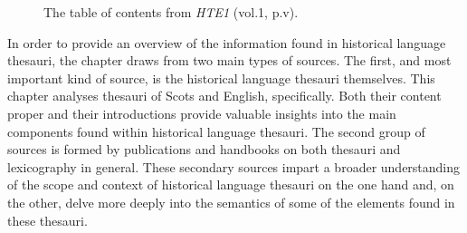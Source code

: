 \begin{figure}[htb]
	\caption[]{\label{fig:Stolk_thes-content:HTE-toc} The table of contents from \textit{HTE1} (vol.1, p.v).}
\end{figure} 



In order to provide an overview of the information found in historical language thesauri, the chapter draws from two main types of sources. The first, and most important kind of source, is the historical language thesauri themselves. This chapter analyses thesauri of Scots and English, specifically. Both their content proper and their introductions provide valuable insights into the main components found within historical language thesauri. The second group of sources is formed by publications and handbooks on both thesauri and lexicography in general. These secondary sources impart a broader understanding of the scope and context of historical language thesauri on the one hand and, on the other, delve more deeply into the semantics of some of the elements found in these thesauri. %

